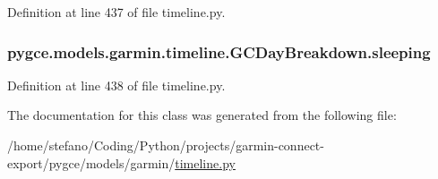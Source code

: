 Definition at line 437 of file timeline.\+py.

\subsubsection[{\texorpdfstring{sleeping}{sleeping}}]{\setlength{\rightskip}{0pt plus 5cm}pygce.\+models.\+garmin.\+timeline.\+G\+C\+Day\+Breakdown.\+sleeping}\hypertarget{classpygce_1_1models_1_1garmin_1_1timeline_1_1_g_c_day_breakdown_a26a3f7d4d5903c8ad6221c11ded6d601}{}\label{classpygce_1_1models_1_1garmin_1_1timeline_1_1_g_c_day_breakdown_a26a3f7d4d5903c8ad6221c11ded6d601}


Definition at line 438 of file timeline.\+py.



The documentation for this class was generated from the following file\+:\begin{DoxyCompactItemize}
\item 
/home/stefano/\+Coding/\+Python/projects/garmin-\/connect-\/export/pygce/models/garmin/\hyperlink{timeline_8py}{timeline.\+py}\end{DoxyCompactItemize}
